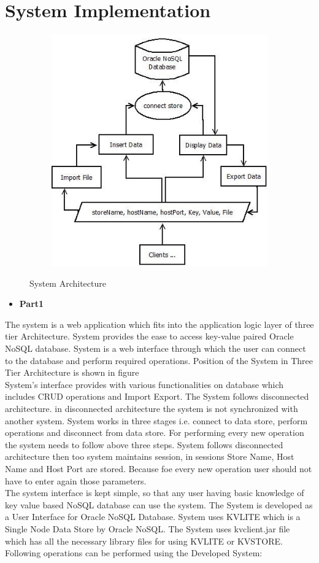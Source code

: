 \section{System Implementation}
\begin{figure}[h]
\centering
  \includegraphics[width=12cm,height=10cm]{Fig21.jpg}\\
  \caption{System Architecture}
  \label{System Architecture}
\end{figure}
\begin{itemize}
  \item \textbf{Part1}
\end{itemize}
The system is a web application which fits into the application logic layer of three tier Architecture. System provides the ease to access key-value paired Oracle NoSQL database. System is a web interface through which the user can connect to the database and perform required operations. Position of the System in Three Tier Architecture is shown in figure
\\
\hspace*{0.7in} System's interface provides with various functionalities on database which includes CRUD operations and Import Export. The System follows disconnected architecture. in disconnected architecture the system is not synchronized with another system. System works in three stages i.e. connect to data store, perform operations and disconnect from data store. For performing every new operation the system needs to follow above three steps. System follows disconnected architecture then too system maintains session, in sessions Store Name, Host Name and Host Port are stored. Because foe every new operation user should not have to enter again those parameters.
\\
\hspace*{0.7in} The system interface is kept simple, so that any user having basic knowledge of key value based NoSQL database can use the system. The System is developed as a User Interface for Oracle NoSQL Database. System uses KVLITE which is a Single Node Data Store by Oracle NoSQL. The System uses kvclient.jar file which has all the necessary library files for using KVLITE or KVSTORE.
\\
Following operations can be performed using the Developed System:\\

